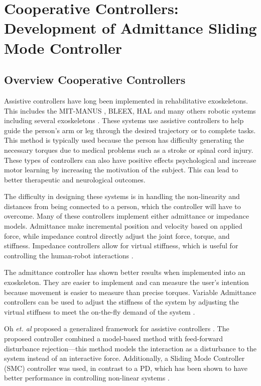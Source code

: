 \section{Cooperative Controllers: Development of Admittance Sliding Mode Controller}


\subsection{Overview Cooperative Controllers}
Assistive controllers have long been implemented in rehabilitative exoskeletons. This includes the MIT-MANUS \cite{ju2005rehabilitation}, BLEEX\cite{kazerooni2006hybrid}, HAL\cite{kawamoto2004power} and many others robotic systems including several exoskeletons \cite{kim2012admittance,ott2010unified,huo2011control}. These systems use assistive controllers to help guide the person's arm or leg through the desired trajectory or to complete tasks. This method is typically used because the person has difficulty generating the necessary torques due to medical problems such as a stroke or spinal cord injury. These types of controllers can also have positive effects  psychological and increase motor learning by increasing the motivation of the subject. This can lead to better   therapeutic and neurological outcomes.

The difficulty in designing these systems is in handling the non-linearity and distances from being connected to a person, which the controller will have to overcome. Many of these controllers implement either admittance or impedance models. Admittance make incremental position and velocity based on applied force, while impedance control directly adjust the joint force, torque, and stiffness. Impedance controllers allow for virtual stiffness, which is useful for controlling the human-robot interactions \cite{keemink2018admittance}. 

The admittance controller has shown better results when implemented into an exoskeleton. They are easier to implement and can measure the user's intention because movement is easier to measure than precise torques. Variable Admittance controllers can be used to adjust the stiffness of the system by adjusting the virtual stiffness to meet the on-the-fly demand of the system \cite{aguirre2007active,newman1994stable}.

Oh \textit{et. al} proposed a generalized framework for assistive controllers \cite{oh2015generalized}. The proposed controller combined a model-based method with feed-forward disturbance rejection—this method models the interaction as a disturbance to the system instead of an interactive force.  Additionally, a Sliding Mode Controller (SMC) controller was used, in contrast to a PD, which has been shown to have better performance in controlling non-linear systems \cite{slotine1991applied}.


